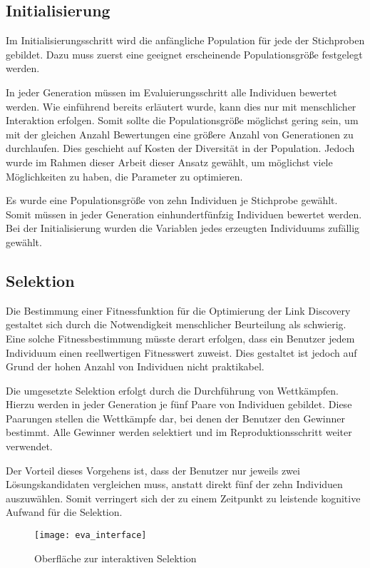 \subsection{Initialisierung}

Im Initialisierungsschritt wird die anfängliche Population für jede der Stichproben gebildet. Dazu muss zuerst eine geeignet erscheinende Populationsgröße festgelegt werden.

In jeder Generation müssen im Evaluierungsschritt alle Individuen bewertet werden. Wie einführend bereits erläutert wurde, kann dies nur mit menschlicher Interaktion erfolgen. Somit sollte die Populationsgröße möglichst gering sein, um mit der gleichen Anzahl Bewertungen eine größere Anzahl von Generationen zu durchlaufen. Dies geschieht auf Kosten der Diversität in der Population. Jedoch wurde im Rahmen dieser Arbeit dieser Ansatz gewählt, um möglichst viele Möglichkeiten zu haben, die Parameter zu optimieren.

Es wurde eine Populationsgröße von zehn Individuen je Stichprobe gewählt. Somit müssen in jeder Generation einhundertfünfzig Individuen bewertet werden. Bei der Initialisierung wurden die Variablen jedes erzeugten Individuums zufällig gewählt.

\subsection{Selektion}

Die Bestimmung einer Fitnessfunktion für die Optimierung der Link Discovery gestaltet sich durch die Notwendigkeit menschlicher Beurteilung als schwierig. Eine solche Fitnessbestimmung müsste derart erfolgen, dass ein Benutzer jedem Individuum einen reellwertigen Fitnesswert zuweist. Dies gestaltet ist jedoch auf Grund der hohen Anzahl von Individuen nicht praktikabel.

Die umgesetzte Selektion erfolgt durch die Durchführung von Wettkämpfen. Hierzu werden in jeder Generation je fünf Paare von Individuen gebildet. Diese Paarungen stellen die Wettkämpfe dar, bei denen der Benutzer den Gewinner bestimmt. Alle Gewinner werden selektiert und im Reproduktionsschritt weiter verwendet.

Der Vorteil dieses Vorgehens ist, dass der Benutzer nur jeweils zwei Lösungskandidaten vergleichen muss, anstatt direkt fünf der zehn Individuen auszuwählen. Somit verringert sich der zu einem Zeitpunkt zu leistende kognitive Aufwand für die Selektion.

\begin{figure}
\centering
\texttt{[image: eva\_interface]}
\caption{Oberfläche zur interaktiven Selektion}
\label{fig:eva_interface}
\end{figure}

